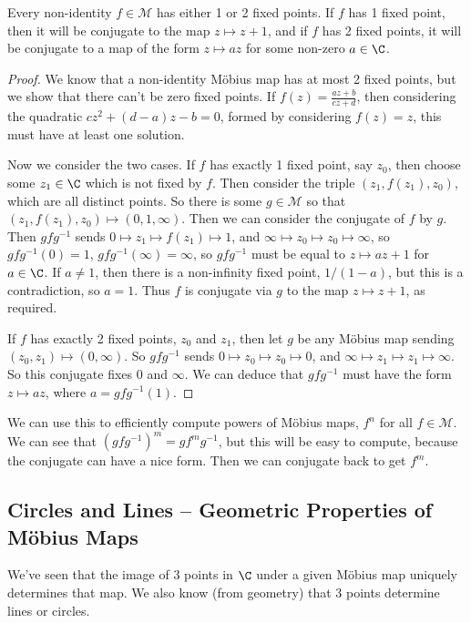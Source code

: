 \documentclass[a4paper]{scrartcl}
\newcommand{\newsection}{\subsection}
\begin{document}
\begin{theorem}
	Every non-identity $f \in \mathcal{M}$ has either 1 or 2 fixed points. If $f$ has 1 fixed point, then it will be conjugate to the map $z \mapsto z + 1$, and if $f$ has 2 fixed points, it will be conjugate to a map of the form $z \mapsto az$ for some non-zero $a \in \C$.
\end{theorem}
\begin{proof}
	We know that a non-identity Möbius map has at most 2 fixed points, but we show that there can't be zero fixed points. If $f(z) = \frac{az + b}{cz + d}$, then considering the quadratic $cz^2 + (d - a)z - b = 0$, formed by considering $f(z) = z$, this must have at least one solution.

	Now we consider the two cases. If $f$ has exactly 1 fixed point, say $z_0$, then choose some $z_1 \in \C$ which is not fixed by $f$. Then consider the triple $(z_1, f(z_1), z_0)$, which are all distinct points.  So there is some $g \in \mathcal{M}$ so that $(z_1, f(z_1), z_0) \mapsto (0, 1, \infty)$.
	Then we can consider the conjugate of $f$ by $g$. Then $gfg^{-1}$ sends $0 \mapsto z_1 \mapsto f(z_1) \mapsto 1$, and $\infty \mapsto z_0 \mapsto z_0 \mapsto \infty$, so $gfg^{-1}(0) = 1$, $gfg^{-1}(\infty) = \infty$, so $gfg^{-1}$ must be equal to $z \mapsto az + 1$ for $a \in \C$. If $a \neq 1$, then there is a non-infinity fixed point, $1/(1 - a)$, but this is a contradiction, so $a = 1$. Thus $f$ is conjugate via $g$ to the map $z \mapsto z + 1$, as required.

	If $f$ has exactly 2 fixed points, $z_0$ and $z_1$, then let $g$ be any Möbius map sending $(z_0, z_1) \mapsto (0, \infty)$. So $gfg^{-1}$ sends $0 \mapsto z_0 \mapsto z_0 \mapsto 0$, and $\infty \mapsto z_1 \mapsto z_1 \mapsto \infty$. So this conjugate fixes $0$ and $\infty$. We can deduce that $gfg^{-1}$ must have the form $z \mapsto az$, where $a = gfg^{-1}(1)$.
\end{proof}

We can use this to efficiently compute powers of Möbius maps, $f^n$ for all $f \in \mathcal{M}$. 
We can see that $(gfg^{-1})^m = gf^m g^{-1}$, but this will be easy to compute, because the conjugate can have a nice form. Then we can conjugate back to get $f^m$.


\newsection{Circles and Lines -- Geometric Properties of Möbius Maps}

We've seen that the image of 3 points in $\C$ under a given Möbius map uniquely determines that map. We also know (from geometry) that 3 points determine lines or circles. 
\end{document}
